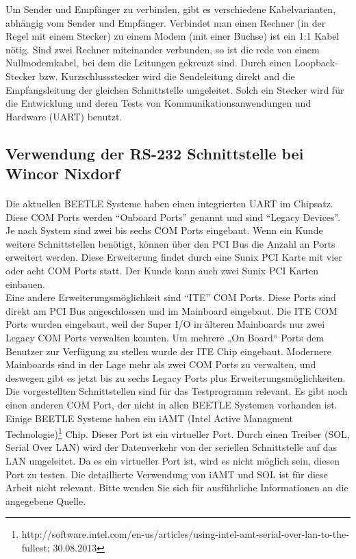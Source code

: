 Um Sender und Empfänger zu verbinden, gibt es verschiedene Kabelvarianten, abhängig vom Sender und Empfänger. Verbindet man einen Rechner (in der Regel mit einem Stecker) zu einem Modem (mit einer Buchse) ist ein 1:1 Kabel nötig. Sind zwei Rechner miteinander verbunden, so ist die rede von einem Nullmodemkabel, bei dem die Leitungen gekreuzt sind. Durch einen Loopback-Stecker bzw. Kurzschlussstecker wird die Sendeleitung direkt and die Empfangsleitung der gleichen Schnittstelle umgeleitet. Solch ein Stecker wird für die Entwicklung und deren Tests von Kommunikationsanwendungen und Hardware (UART) benutzt.


\subsection{Verwendung der RS-232 Schnittstelle bei Wincor Nixdorf}
\paragraph{}
Die aktuellen BEETLE Systeme haben einen integrierten UART im Chipsatz. Diese COM Ports werden "`Onboard Ports"' genannt und sind "`Legacy Devices"'. Je nach System sind zwei bis sechs COM Ports eingebaut. Wenn ein Kunde weitere Schnittstellen benötigt, können über den PCI Bus die Anzahl an Ports erweitert werden. Diese Erweiterung findet durch eine Sunix PCI Karte mit vier oder acht COM Ports statt. Der Kunde kann auch zwei Sunix PCI Karten einbauen.\\

Eine andere Erweiterungsmöglichkeit sind "`ITE"' COM Ports. Diese Ports sind direkt am PCI Bus angeschlossen und im Mainboard eingebaut. Die ITE COM Ports wurden eingebaut, weil der Super I/O in älteren Mainboards nur zwei Legacy COM Ports verwalten konnten. Um mehrere „On Board“ Ports dem Benutzer zur Verfügung zu stellen wurde der ITE Chip eingebaut. Modernere Mainboards sind in der Lage mehr als zwei COM Ports zu verwalten, und deswegen gibt es jetzt bis zu sechs Legacy Ports plus Erweiterungsmöglichkeiten.\\

Die vorgestellten Schnittstellen sind für das Testprogramm relevant. Es gibt noch einen anderen COM Port, der nicht in allen BEETLE Systemen vorhanden ist. Einige BEETLE Systeme haben ein iAMT (Intel Active Managment Technologie)\footnote{http://software.intel.com/en-us/articles/using-intel-amt-serial-over-lan-to-the-fullest; 30.08.2013} Chip. Dieser Port ist ein virtueller Port. Durch einen Treiber (SOL, Serial Over LAN) wird der Datenverkehr von der seriellen Schnittstelle auf das LAN umgeleitet. Da es ein virtueller Port ist, wird es nicht möglich sein, diesen Port zu testen. Die detaillierte Verwendung von iAMT und SOL ist für diese Arbeit nicht relevant. Bitte wenden Sie sich für ausführliche Informationen an die angegebene Quelle.\\

